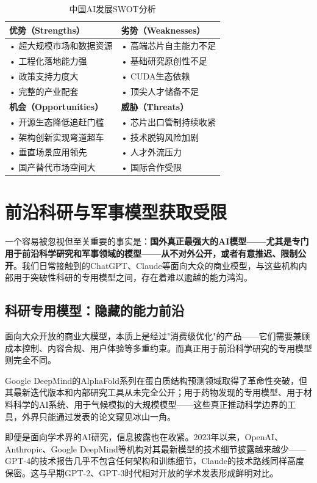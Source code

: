 \begin{table}[H]
\centering
\caption{中国AI发展SWOT分析}
\small
\begin{tabular}{p{6cm}p{6cm}}
\toprule
\textbf{优势（Strengths）} & \textbf{劣势（Weaknesses）} \\
\midrule
• 超大规模市场和数据资源 & • 高端芯片自主能力不足 \\
• 工程化落地能力强 & • 基础研究原创性不足 \\
• 政策支持力度大 & • CUDA生态依赖 \\
• 完整的产业配套 & • 顶尖人才储备不足 \\
\midrule
\textbf{机会（Opportunities）} & \textbf{威胁（Threats）} \\
\midrule
• 开源生态降低追赶门槛 & • 芯片出口管制持续收紧 \\
• 架构创新实现弯道超车 & • 技术脱钩风险加剧 \\
• 垂直场景应用领先 & • 人才外流压力 \\
• 国产替代市场空间大 & • 国际合作受限 \\
\bottomrule
\end{tabular}
\end{table}

\section{前沿科研与军事模型获取受限}

一个容易被忽视但至关重要的事实是：\textbf{国外真正最强大的AI模型——尤其是专门用于前沿科学研究和军事领域的模型——从不对外公开，或者有意推迟、限制公开}。我们日常接触到的ChatGPT、Claude等面向大众的商业模型，与这些机构内部用于突破性科研的专用模型之间，存在着难以逾越的能力鸿沟。

\subsection{科研专用模型：隐藏的能力前沿}

面向大众开放的商业大模型，本质上是经过"消费级优化"的产品——它们需要兼顾成本控制、内容合规、用户体验等多重约束。而真正用于前沿科学研究的专用模型则完全不同。

Google DeepMind的AlphaFold系列在蛋白质结构预测领域取得了革命性突破，但其最新迭代版本和内部研究工具从未完全公开；用于药物发现的专用模型、用于材料科学的AI系统、用于气候模拟的大规模模型——这些真正推动科学边界的工具，外界只能通过发表的论文窥见冰山一角。

即便是面向学术界的AI研究，信息披露也在收紧。2023年以来，OpenAI、Anthropic、Google DeepMind等机构对其最新模型的技术细节披露越来越少——GPT-4的技术报告几乎不包含任何架构和训练细节，Claude的技术路线同样高度保密。这与早期GPT-2、GPT-3时代相对开放的学术发表形成鲜明对比。

